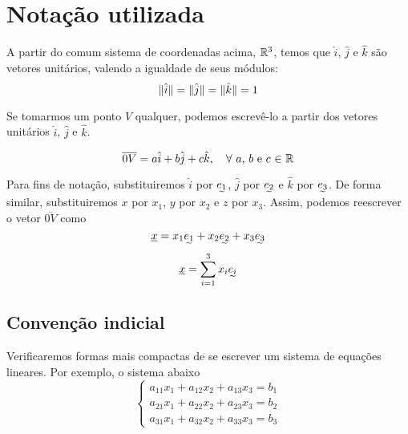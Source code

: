 \section{Notação utilizada}

    
    
    A partir do comum sistema de coordenadas acima, $\mathbb{R}^3$, temos que $\hat{i}$, $\hat{j}$ e $\hat{k}$ são vetores unitários, valendo a igualdade de seus módulos: $$\Vert\hat{i}\Vert=\Vert\hat{j}\Vert=\Vert\hat{k}\Vert=1$$
    
    Se tomarmos um ponto $V$ qualquer, podemos escrevê-lo a partir dos vetores unitários $\hat{i}$, $\hat{j}$ e $\hat{k}$.
    
    
    \[\overline{0V}=a\hat{i}+b\hat{j}+c\hat{k},\quad\text{$\forall$ $a$, $b$ e $c$ $\in$ $\mathbb{R}$}\]
    
    Para fins de notação, substituiremos $\hat{i}$ por $\undertilde{e_1}$, $\hat{j}$ por $\undertilde{e_2}$ e $\hat{k}$ por $\undertilde{e_3}$. De forma similar, substituiremos $x$ por $x_1$, $y$ por $x_2$ e $z$ por $x_3$. Assim, podemos reescrever o vetor $\overline{0V}$ como
    \[\underline{x}=x_1\undertilde{e_1}+x_2\undertilde{e_2}+x_3\undertilde{e_3}\]
    \begin{equation}
        \label{eqn:notacao_utilizada_01}
        \underline{x}=\sum_{i=1}^3x_i\undertilde{e_i}
    \end{equation}

    \subsection{Convenção indicial}
    
    Verificaremos formas mais compactas de se escrever um sistema de equações lineares. Por exemplo, o sistema abaixo
    \[
        \begin{cases}
            a_{11}x_1+a_{12}x_2+a_{13}x_3=b_1\\
            a_{21}x_1+a_{22}x_2+a_{23}x_3=b_2\\
            a_{31}x_1+a_{32}x_2+a_{33}x_3=b_3
        \end{cases}
    \]
    
